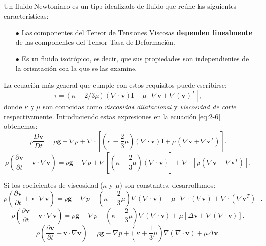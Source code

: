 \documentclass[a4paper,10pt, oneside]{book}
\begin{document}
Un fluido Newtoniano es un tipo idealizado de fluido que reúne las siguientes características:
\begin{itemize}
	\item[$\bullet$] Las componentes del Tensor de Tensiones Viscosas  \textbf{dependen linealmente} de las componentes del Tensor Tasa de Deformación.
	\item[$\bullet$] Es un fluido isotrópico, es decir, que sus propiedades son independientes de la orientación con la que se las examine.
\end{itemize}

La ecuación más general que cumple con estos requisitos puede escribirse:
\begin{equation}
	\tau = (\kappa - 2/3 \mu) (\nabla \cdot \mathbf{v}) \mathbf{I} + \mu [\nabla \mathbf{v} + \nabla (\mathbf{v})^T], \nonumber
\end{equation}
donde $\kappa$ y $\mu$ son conocidas como \textit{viscosidad dilatacional} y \textit{viscosidad de corte} respectivamente. Introduciendo estas expresiones en la ecuación \ref{eq:2-6} obtenemos:
\begin{equation}
	\rho \frac{D \mathbf{v}}{Dt} = \rho \mathbf{g} -\nabla p + \nabla \cdot \left[ \left( \kappa - \frac{2}{3} \mu \right) \left( \nabla \cdot \mathbf{v} \right) \mathbf{I} + \mu \left( \nabla \mathbf{v} + \nabla \mathbf{v}^T \right) \right]. \nonumber
\end{equation}
\begin{equation}
	\rho \left( \frac{\partial \mathbf{v}}{\partial t} + \mathbf{v} \cdot \nabla \mathbf{v} \right) = \rho \mathbf{g} -\nabla p + \nabla \left[ \left( \kappa - \frac{2}{3} \mu \right) \left( \nabla \cdot \mathbf{v} \right)\right] + \nabla \cdot \left[ \mu \left( \nabla \mathbf{v} + \nabla \mathbf{v}^T \right) \right]. \nonumber
\end{equation}

Si los coeficientes de viscosidad ($\kappa$ y $\mu$) son constantes, desarrollamos:
\begin{equation}
	\rho \left( \frac{\partial \mathbf{v}}{\partial t} + \mathbf{v} \cdot \nabla \mathbf{v} \right) = \rho \mathbf{g} -\nabla p + \left( \kappa - \frac{2}{3} \mu \right) \nabla \left( \nabla \cdot \mathbf{v} \right) + \mu \left[ \nabla \cdot \left( \nabla \mathbf{v} \right) + \nabla \cdot \left( \nabla \mathbf{v}^T \right) \right]. \nonumber
\end{equation}
\begin{equation}
	\rho \left( \frac{\partial \mathbf{v}}{\partial t} + \mathbf{v} \cdot \nabla \mathbf{v} \right) = \rho \mathbf{g} -\nabla p + \left( \kappa - \frac{2}{3} \mu \right) \nabla \left( \nabla \cdot \mathbf{v} \right) + \mu \left[\Delta \mathbf{v} + \nabla \left( \nabla \cdot \mathbf{v} \right) \right]. \nonumber
\end{equation}
\begin{equation}
	\rho \left( \frac{\partial \mathbf{v}}{\partial t} + \mathbf{v} \cdot \nabla \mathbf{v} \right) = \rho \mathbf{g} -\nabla p + \left( \kappa + \frac{1}{3} \mu \right) \nabla \left( \nabla \cdot \mathbf{v} \right) + \mu \Delta \mathbf{v}. \nonumber
\end{equation}
\end{document}
